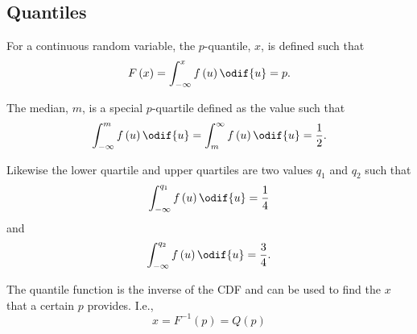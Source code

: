 \documentclass{article}
\begin{document}
\subsection{Quantiles}
\begin{definition}[\(p\)-Quantile]
    For a continuous random variable, the \(p\)-quantile, \(x\), is defined such that
    \begin{equation*}
        F\left( x \right) = \int_{-\infty}^x f\left( u \right) \odif{u} = p.
    \end{equation*}
\end{definition}
\begin{definition}[Median]
    The median, \(m\), is a special \(p\)-quartile defined as the value such that
    \begin{equation*}
        \int_{-\infty}^m f\left( u \right) \odif{u} = \int^{\infty}_m f\left( u \right) \odif{u} = \frac{1}{2}.
    \end{equation*}
\end{definition}
\begin{definition}
    Likewise the lower quartile and upper quartiles are two values \(q_1\) and \(q_2\) such that
    \begin{equation*}
        \int_{-\infty}^{q_1} f\left( u \right) \odif{u} = \frac{1}{4}
    \end{equation*}
    and
    \begin{equation*}
        \int_{-\infty}^{q_2} f\left( u \right) \odif{u} = \frac{3}{4}.
    \end{equation*}
\end{definition}
\begin{definition}
    The quantile function is the inverse of the CDF
    and can be used to find the \(x\) that a certain \(p\) provides. I.e.,
    \begin{equation*}
        x = F^{-1}\left( p \right) = Q\left( p \right)
    \end{equation*}
\end{definition}
\end{document}
